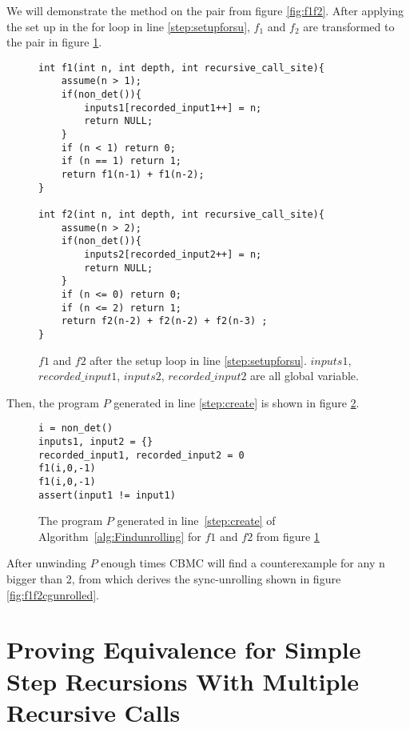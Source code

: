 We will demonstrate the method on the pair from figure \ref{fig:f1f2}. After applying the set up in the for loop in line \ref{step:setupforsu}, $f_1$ and $f_2$ are transformed to the pair in figure \ref{fig:f1f2susetup}.
\begin{figure}[h]
\begin{center}
\begin{lstlisting}
int f1(int n, int depth, int recursive_call_site){
    assume(n > 1);
    if(non_det()){
        inputs1[recorded_input1++] = n;
        return NULL;
    }
    if (n < 1) return 0;
    if (n == 1) return 1; 
    return f1(n-1) + f1(n-2);
}

int f2(int n, int depth, int recursive_call_site){
    assume(n > 2);
    if(non_det()){
        inputs2[recorded_input2++] = n;
        return NULL;
    }
    if (n <= 0) return 0;
    if (n <= 2) return 1;
    return f2(n-2) + f2(n-2) + f2(n-3) ;
}
\end{lstlisting}
\caption{$f1$ and $f2$ after the setup loop in line \ref{step:setupforsu}. $inputs1$, $recorded\_input1$, $inputs2$, $recorded\_input2$ are all global variable.}
\label{fig:f1f2susetup}
\end{center}
\end{figure}

Then, the program $P$ generated in line \ref{step:create} is shown in figure \ref{fig:findcutverfprogramf1f2}.
\begin{figure} [h]
\begin{center}
\begin{minipage}{7 cm}
\begin{lstlisting}
i = non_det()
inputs1, input2 = {}
recorded_input1, recorded_input2 = 0
f1(i,0,-1)
f1(i,0,-1)
assert(input1 != input1)
\end{lstlisting}
\end{minipage}
\caption{The program $P$ generated in line~\ref{step:create} of Algorithm~\ref{alg:Findunrolling} for $f1$ and $f2$ from figure \ref{fig:f1f2susetup}}
\label{fig:findcutverfprogramf1f2}
\end{center}
\end{figure}

After unwinding $P$ enough times CBMC will find a counterexample for any n bigger than 2, from which  derives the sync-unrolling shown in figure \ref{fig:f1f2cgunrolled}.

\section{Proving Equivalence for Simple Step Recursions With Multiple Recursive Calls}
\label{sec:newproof}
